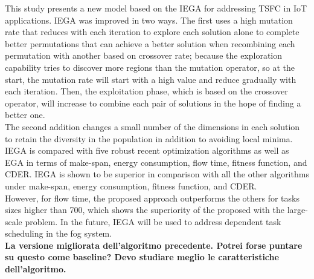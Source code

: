 This study presents a new model based on the IEGA for addressing TSFC in IoT applications. IEGA was improved in two ways. 
The first uses a high mutation rate that reduces with each iteration to explore each solution alone to complete better permutations that
can achieve a better solution when recombining each permutation with another based on crossover rate; because the exploration capability tries to discover more regions than the
mutation operator, so at the start, the mutation rate will start with a high value and reduce gradually with each iteration. 
Then, the exploitation phase, which is based on the crossover operator, will increase to combine each pair of solutions in the hope of finding a better one. \\
The second addition changes a small number of the dimensions in each solution to retain the diversity in the population in addition to avoiding local minima. 
IEGA is compared with five robust recent optimization algorithms as well as EGA in terms of make-span, energy consumption, flow time, fitness function, and CDER. 
IEGA is shown to be superior in comparison with all the other algorithms under make-span, energy consumption, fitness function, and CDER. \\
However, for flow time, the proposed approach outperforms the others for tasks sizes higher than 700, which shows the superiority of the proposed with the large-scale problem. 
In the future, IEGA will be used to address dependent task scheduling in the fog system.\\
\textbf{La versione migliorata dell'algoritmo precedente. Potrei forse puntare su questo come baseline? Devo studiare meglio le caratteristiche dell'algoritmo.}


